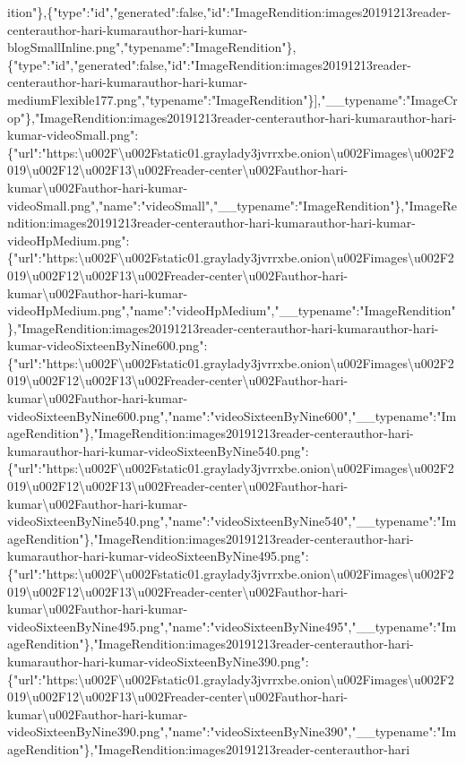 ition"\},\{"type":"id","generated":false,"id":"ImageRendition:images20191213reader-centerauthor-hari-kumarauthor-hari-kumar-blogSmallInline.png","typename":"ImageRendition"\},\{"type":"id","generated":false,"id":"ImageRendition:images20191213reader-centerauthor-hari-kumarauthor-hari-kumar-mediumFlexible177.png","typename":"ImageRendition"\}{]},"\_\_typename":"ImageCrop"\},"ImageRendition:images20191213reader-centerauthor-hari-kumarauthor-hari-kumar-videoSmall.png":\{"url":"https:\textbackslash{}u002F\textbackslash{}u002Fstatic01.graylady3jvrrxbe.onion\textbackslash{}u002Fimages\textbackslash{}u002F2019\textbackslash{}u002F12\textbackslash{}u002F13\textbackslash{}u002Freader-center\textbackslash{}u002Fauthor-hari-kumar\textbackslash{}u002Fauthor-hari-kumar-videoSmall.png","name":"videoSmall","\_\_typename":"ImageRendition"\},"ImageRendition:images20191213reader-centerauthor-hari-kumarauthor-hari-kumar-videoHpMedium.png":\{"url":"https:\textbackslash{}u002F\textbackslash{}u002Fstatic01.graylady3jvrrxbe.onion\textbackslash{}u002Fimages\textbackslash{}u002F2019\textbackslash{}u002F12\textbackslash{}u002F13\textbackslash{}u002Freader-center\textbackslash{}u002Fauthor-hari-kumar\textbackslash{}u002Fauthor-hari-kumar-videoHpMedium.png","name":"videoHpMedium","\_\_typename":"ImageRendition"\},"ImageRendition:images20191213reader-centerauthor-hari-kumarauthor-hari-kumar-videoSixteenByNine600.png":\{"url":"https:\textbackslash{}u002F\textbackslash{}u002Fstatic01.graylady3jvrrxbe.onion\textbackslash{}u002Fimages\textbackslash{}u002F2019\textbackslash{}u002F12\textbackslash{}u002F13\textbackslash{}u002Freader-center\textbackslash{}u002Fauthor-hari-kumar\textbackslash{}u002Fauthor-hari-kumar-videoSixteenByNine600.png","name":"videoSixteenByNine600","\_\_typename":"ImageRendition"\},"ImageRendition:images20191213reader-centerauthor-hari-kumarauthor-hari-kumar-videoSixteenByNine540.png":\{"url":"https:\textbackslash{}u002F\textbackslash{}u002Fstatic01.graylady3jvrrxbe.onion\textbackslash{}u002Fimages\textbackslash{}u002F2019\textbackslash{}u002F12\textbackslash{}u002F13\textbackslash{}u002Freader-center\textbackslash{}u002Fauthor-hari-kumar\textbackslash{}u002Fauthor-hari-kumar-videoSixteenByNine540.png","name":"videoSixteenByNine540","\_\_typename":"ImageRendition"\},"ImageRendition:images20191213reader-centerauthor-hari-kumarauthor-hari-kumar-videoSixteenByNine495.png":\{"url":"https:\textbackslash{}u002F\textbackslash{}u002Fstatic01.graylady3jvrrxbe.onion\textbackslash{}u002Fimages\textbackslash{}u002F2019\textbackslash{}u002F12\textbackslash{}u002F13\textbackslash{}u002Freader-center\textbackslash{}u002Fauthor-hari-kumar\textbackslash{}u002Fauthor-hari-kumar-videoSixteenByNine495.png","name":"videoSixteenByNine495","\_\_typename":"ImageRendition"\},"ImageRendition:images20191213reader-centerauthor-hari-kumarauthor-hari-kumar-videoSixteenByNine390.png":\{"url":"https:\textbackslash{}u002F\textbackslash{}u002Fstatic01.graylady3jvrrxbe.onion\textbackslash{}u002Fimages\textbackslash{}u002F2019\textbackslash{}u002F12\textbackslash{}u002F13\textbackslash{}u002Freader-center\textbackslash{}u002Fauthor-hari-kumar\textbackslash{}u002Fauthor-hari-kumar-videoSixteenByNine390.png","name":"videoSixteenByNine390","\_\_typename":"ImageRendition"\},"ImageRendition:images20191213reader-centerauthor-hari